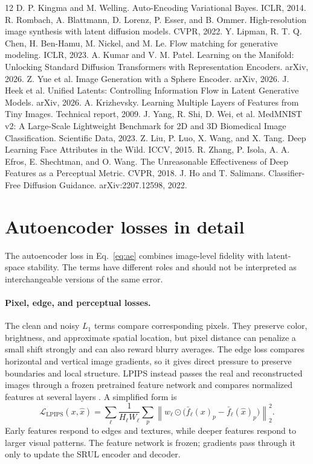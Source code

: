 \documentclass{article}
\begin{document}
\clearpage
{\small
\begin{thebibliography}{12}
 D. P. Kingma and M. Welling. Auto-Encoding Variational Bayes. ICLR, 2014.
 R. Rombach, A. Blattmann, D. Lorenz, P. Esser, and B. Ommer. High-resolution image synthesis with latent diffusion models. CVPR, 2022.
 Y. Lipman, R. T. Q. Chen, H. Ben-Hamu, M. Nickel, and M. Le. Flow matching for generative modeling. ICLR, 2023.
 A. Kumar and V. M. Patel. Learning on the Manifold: Unlocking Standard Diffusion Transformers with Representation Encoders. arXiv, 2026.
 Z. Yue et al. Image Generation with a Sphere Encoder. arXiv, 2026.
 J. Heek et al. Unified Latents: Controlling Information Flow in Latent Generative Models. arXiv, 2026.
 A. Krizhevsky. Learning Multiple Layers of Features from Tiny Images. Technical report, 2009.
 J. Yang, R. Shi, D. Wei, et al. MedMNIST v2: A Large-Scale Lightweight Benchmark for 2D and 3D Biomedical Image Classification. Scientific Data, 2023.
 Z. Liu, P. Luo, X. Wang, and X. Tang. Deep Learning Face Attributes in the Wild. ICCV, 2015.
 R. Zhang, P. Isola, A. A. Efros, E. Shechtman, and O. Wang. The Unreasonable Effectiveness of Deep Features as a Perceptual Metric. CVPR, 2018.
 J. Ho and T. Salimans. Classifier-Free Diffusion Guidance. arXiv:2207.12598, 2022.
\end{thebibliography}}


\clearpage
\appendix
\section{Autoencoder losses in detail}
\label{app:ae}
The autoencoder loss in Eq.~\eqref{eq:ae} combines image-level fidelity with latent-space stability. The terms have different roles and should not be interpreted as interchangeable versions of the same error.

\paragraph{Pixel, edge, and perceptual losses.}
The clean and noisy $L_1$ terms compare corresponding pixels. They preserve color, brightness, and approximate spatial location, but pixel distance can penalize a small shift strongly and can also reward blurry averages. The edge loss compares horizontal and vertical image gradients, so it gives direct pressure to preserve boundaries and local structure. LPIPS instead passes the real and reconstructed images through a frozen pretrained feature network and compares normalized features at several layers \cite{lpips}. A simplified form is
\begin{equation}
 \mathcal L_{\mathrm{LPIPS}}(x,\hat x)
 =\sum_{\ell}\frac{1}{H_\ell W_\ell}
 \sum_p\left\|w_\ell\odot
 \big(\bar f_\ell(x)_p-\bar f_\ell(\hat x)_p\big)\right\|_2^2.
\end{equation}
Early features respond to edges and textures, while deeper features respond to larger visual patterns. The feature network is frozen; gradients pass through it only to update the SRUL encoder and decoder.
\end{document}

